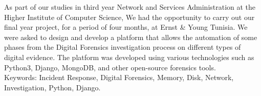 \hspace{-0.6cm}\hrulefill

\hspace{-0.6cm}As part of our studies in third year Network and Services Administration at the Higher Institute of Computer Science, We had the opportunity to carry out our final year project, for a period of four months, at Ernst \& Young Tunisia. We were asked to design and develop a platform that allows the automation of some phases from the Digital Forensics investigation process on different types of digital evidence. The platform was developed using various technologies such as Python3, Django, MongoDB, and other open-source forensics tools.\\Keywords: Incident Response, Digital Forensics, Memory, Disk, Network, Investigation, Python, Django.
% 